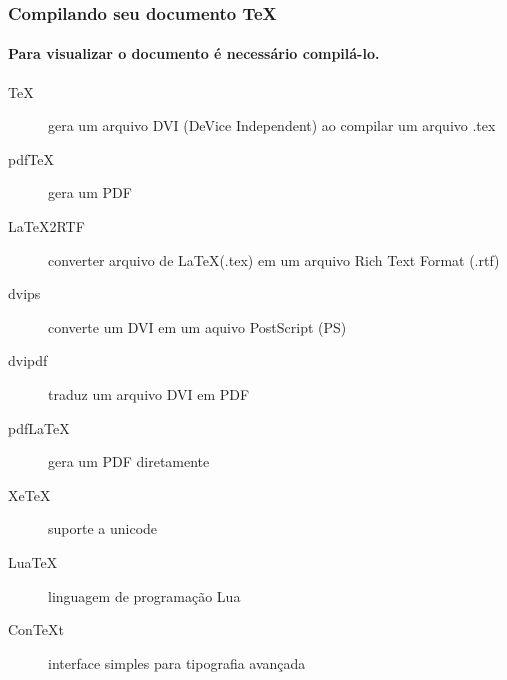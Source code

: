 \begin{frame}
\frametitle{Compilando seu documento \TeX{}}
\framesubtitle{Para visualizar o documento é necessário compilá-lo.}
   \begin{description}
   \item[\TeX] gera um arquivo DVI (DeVice Independent) ao compilar um arquivo .tex
   \item[pdfTeX] gera um PDF
   \item[LaTeX2RTF] converter arquivo de \LaTeX (.tex) em um arquivo  Rich Text Format (.rtf)
   \item[dvips] converte um DVI em um aquivo PostScript (PS)
   \item[dvipdf] traduz um arquivo DVI em PDF
   \item[pdfLaTeX] gera um PDF diretamente
   \item[XeTeX] suporte a unicode
   \item[LuaTeX] linguagem de programação Lua
   \item[ConTeXt] interface simples para tipografia avançada
   \end{description}
\end{frame}


